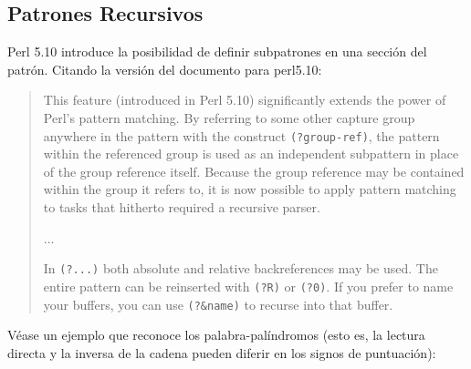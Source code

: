 \subsection{Patrones Recursivos}

Perl 5.10 introduce la posibilidad de definir 
subpatrones en una sección del patrón. 
Citando la versión del documento  para
perl5.10:

\begin{it}
\begin{quotation}
This feature (introduced in Perl 5.10) significantly extends the power
of Perl’s pattern matching.  By referring to some other capture group
anywhere in the
pattern with the construct \verb"(?group-ref)", the pattern within the
referenced group is used as an independent subpattern in place of the
group reference itself.
Because the group reference may be contained within the group it refers
to, it is now possible to apply pattern matching to tasks that hitherto
required a
recursive parser.

...

In \verb"(?...)" both absolute and relative backreferences may be used.  
The entire pattern can be reinserted with \verb"(?R)" or \verb"(?0)".  If you prefer to name your
buffers, you can use \verb"(?&name)" to recurse into that buffer.
\end{quotation}
\end{it}

\label{parrafo:palabrapalindromos}

Véase un ejemplo que reconoce los palabra-palíndromos (esto es, 
la lectura directa y la inversa  de la cadena
pueden diferir en los signos de puntuación):

